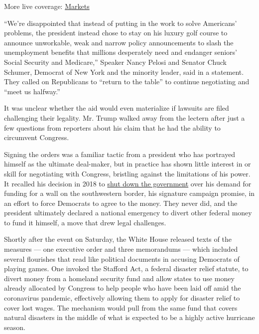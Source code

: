 More live coverage:
\href{https://www.nytimes.com/live/2020/08/07/business/stock-market-today-coronavirus?action=click\&pgtype=Article\&state=default\&region=MAIN_CONTENT_1\&context=storylines_live_updates}{Markets}

``We're disappointed that instead of putting in the work to solve
Americans' problems, the president instead chose to stay on his luxury
golf course to announce unworkable, weak and narrow policy announcements
to slash the unemployment benefits that millions desperately need and
endanger seniors' Social Security and Medicare,'' Speaker Nancy Pelosi
and Senator Chuck Schumer, Democrat of New York and the minority leader,
said in a statement. They called on Republicans to ``return to the
table'' to continue negotiating and ``meet us halfway.''

It was unclear whether the aid would even materialize if lawsuits are
filed challenging their legality. Mr. Trump walked away from the lectern
after just a few questions from reporters about his claim that he had
the ability to circumvent Congress.

Signing the orders was a familiar tactic from a president who has
portrayed himself as the ultimate deal-maker, but in practice has shown
little interest in or skill for negotiating with Congress, bristling
against the limitations of his power. It recalled his decision in 2018
to
\href{https://www.nytimes.com/2018/12/21/us/politics/trump-shutdown-border-wall.html}{shut
down the government} over his demand for funding for a wall on the
southwestern border, his signature campaign promise, in an effort to
force Democrats to agree to the money. They never did, and the president
ultimately declared a national emergency to divert other federal money
to fund it himself, a move that drew legal challenges.

Shortly after the event on Saturday, the White House released texts of
the measures --- one executive order and three memorandums --- which
included several flourishes that read like political documents in
accusing Democrats of playing games. One invoked the Stafford Act, a
federal disaster relief statute, to divert money from a homeland
security fund and allow states to use money already allocated by
Congress to help people who have been laid off amid the coronavirus
pandemic, effectively allowing them to apply for disaster relief to
cover lost wages. The mechanism would pull from the same fund that
covers natural disasters in the middle of what is expected to be a
highly active hurricane season.

